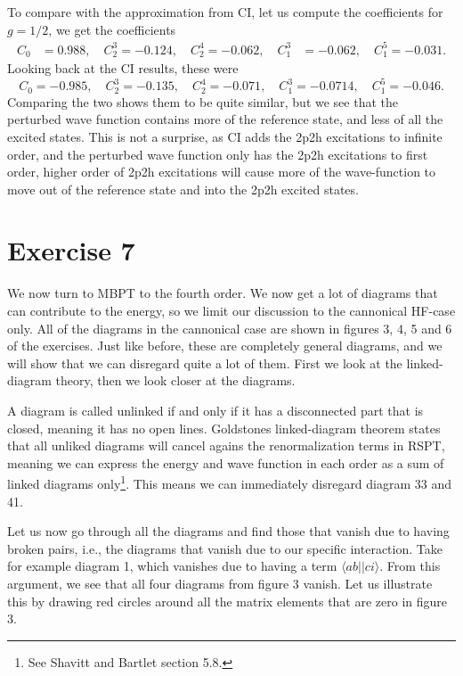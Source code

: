 \documentclass[a4paper, 11pt, notitlepage, english]{article}
\newcommand{\brakket}[2]{\langle #1 || #2 \rangle}
\begin{document}
To compare with the approximation from CI, let us compute the coefficients for $g=1/2$, we get the coefficients
\begin{align*}
C_0 &= 0.988, \quad C_2^3 = -0.124,  \quad C_2^4 = -0.062, \quad C_1^3 &= -0.062, \quad C_1^5 = -0.031.
\end{align*}
Looking back at the CI results, these were
$$C_0 = -0.985, \quad C_2^3 = -0.135,  \quad C_2^4 = -0.071, \quad C_1^3 = -0.0714, \quad C_1^5 = -0.046.$$
Comparing the two shows them to be quite similar, but we see that the perturbed wave function contains more of the reference state, and less of all the excited states. This is not a surprise, as CI adds the 2p2h excitations to infinite order, and the perturbed wave function only has the 2p2h excitations to first order, higher order of 2p2h excitations will cause more of the wave-function to move out of the reference state and into the 2p2h excited states.


\clearpage

\section*{Exercise 7}

We now turn to MBPT to the fourth order. We now get a lot of diagrams that can contribute to the energy, so we limit our discussion to the cannonical HF-case only. All of the diagrams in the cannonical case are shown in figures 3, 4, 5 and 6 of the exercises. Just like before, these are completely general diagrams, and we will show that we can disregard quite a lot of them. First we look at the linked-diagram theory, then we look closer at the diagrams. 

A diagram is called unlinked if and only if it has a disconnected part that is closed, meaning it has no open lines. Goldstones linked-diagram theorem states that all unliked diagrams will cancel agains the renormalization terms in RSPT, meaning we can express the energy and wave function in each order as a sum of linked diagrams only\footnote{See Shavitt and Bartlet section 5.8.}. This means we can immediately disregard diagram 33 and 41.

Let us now go through all the diagrams and find those that vanish due to having broken pairs, i.e., the diagrams that vanish due to our specific interaction. Take for example diagram 1, which vanishes due to having a term $\brakket{ab}{ci}$. From this argument, we see that all four diagrams from figure 3 vanish. Let us illustrate this by drawing red circles around all the matrix elements that are zero in figure 3.
\end{document}

